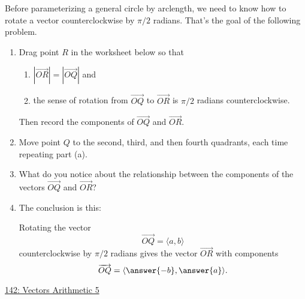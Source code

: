\documentclass{ximera}
\begin{document}
Before parameterizing a general circle by arclength, we need to know how to rotate a vector counterclockwise by $\pi/2$ radians.
That's the goal of the following problem.


\begin{question} \label{Q77ee333}


\begin{enumerate}
\item Drag point $R$ in the worksheet below so that
\begin{enumerate}
\item $\left|\overrightarrow{OR}\right| = \left|\overrightarrow{OQ}\right|$ and
\item the sense of rotation from $\overrightarrow{OQ}$ to $\overrightarrow{OR}$ is $\pi/2$ radians counterclockwise.
\end{enumerate}
Then record the components of $\overrightarrow{OQ}$ and $\overrightarrow{OR}$.

\item Move point $Q$ to the second, third, and then fourth quadrants, each time repeating part (a).

\item What do you notice about the relationship between the components of the vectors $\overrightarrow{OQ}$ and $\overrightarrow{OR}$?

\item The conclusion is this:

Rotating the vector 
\[
  \overrightarrow{OQ} = \langle a, b\rangle
\]
counterclockwise by $\pi/2$ radians gives the vector $\overrightarrow{OR}$ with components
\[
  \overrightarrow{OQ} = \langle \answer{-b}, \answer{a}\rangle .
\] 

\end{enumerate}

\begin{onlineOnly}
    \begin{center}
\end{center}
\end{onlineOnly}

\href{https://www.desmos.com/calculator/in7whvqoay}{142: Vectors Arithmetic 5}


\end{question}
\end{document}
